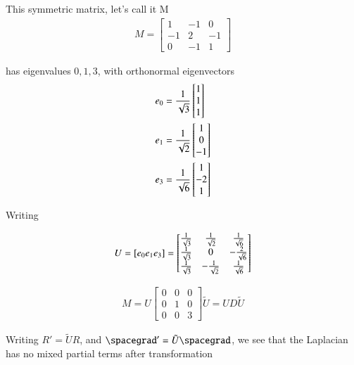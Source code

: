 This symmetric matrix, let's call it M
\begin{align}\label{eqn:desaiCh9:704}
M=
\begin{bmatrix}
1 & -1 & 0 \\
-1 & 2 & -1 \\
0 & -1 & 1
\end{bmatrix}
\end{align}

has eigenvalues $0,1,3$, with orthonormal eigenvectors
\begin{align}\label{eqn:desaiCh9:705}
e_0 &=
\frac{1}{\sqrt{3}}
\begin{bmatrix}
1 \\
1 \\
1
\end{bmatrix} \\
e_1 &=
\frac{1}{\sqrt{2}}
\begin{bmatrix}
1 \\
0 \\
-1
\end{bmatrix} \\
e_3 &=
\frac{1}{\sqrt{6}}
\begin{bmatrix}
1 \\
-2 \\
1
\end{bmatrix}
\end{align}

Writing

\begin{align}\label{eqn:desaiCh9:706}
U = [e_0 e_1 e_3]
=
\begin{bmatrix}
\frac{1}{\sqrt{3}} & \frac{1}{\sqrt{2}}  & \frac{1}{\sqrt{6}}  \\
\frac{1}{\sqrt{3}} & 0  & -\frac{2}{\sqrt{6}}  \\
\frac{1}{\sqrt{3}} & -\frac{1}{\sqrt{2}}  & \frac{1}{\sqrt{6}}
\end{bmatrix}
\end{align}

\begin{align}\label{eqn:desaiCh9:707}
M = U
\begin{bmatrix}
0 & 0 & 0 \\
0 & 1 & 0 \\
0 & 0 & 3
\end{bmatrix}
\tilde{U}
=
U D \tilde{U}
\end{align}

Writing $R' = \tilde{U} R$, and $\spacegrad' = \tilde{U} \spacegrad$, we see that the Laplacian has no mixed partial terms after transformation

